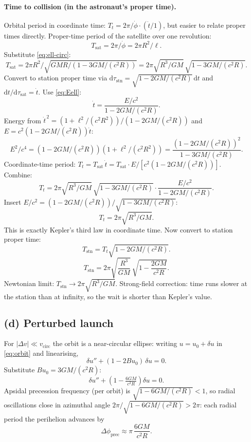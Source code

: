 \documentclass[11pt]{article}
\newcommand{\de}{\mathrm{d}}
\begin{document}
\paragraph{Time to collision (in the astronaut's proper time).}
Orbital period in coordinate time: $T_t = 2\pi/\dot\phi\cdot(\dot t/1)$, but easier to relate proper times directly. Proper-time period of the satellite over one revolution:
\[
T_\text{sat} = 2\pi/\dot\phi = 2\pi R^2/\ell.
\]
Substitute \eqref{eq:ell-circ}:
\[
T_\text{sat} = 2\pi R^2/\sqrt{GMR/(1-3GM/(c^2 R))} = 2\pi\sqrt{R^3/GM}\,\sqrt{1-3GM/(c^2 R)}.
\]
Convert to station proper time via $\de\tau_\text{stn} = \sqrt{1-2GM/(c^2 R)}\,\de t$ and $\de t/\de\tau_\text{sat} = \dot t$. Use \eqref{eq:Eell}:
\[
\dot t = \frac{E/c^2}{1-2GM/(c^2 R)}.
\]
Energy from $\dot t^{\,2} = (1+\ell^2/(c^2 R^2))/(1-2GM/(c^2 R))$ and $E = c^2(1-2GM/(c^2 R))\dot t$:
\[
E^2/c^4 = (1-2GM/(c^2 R))(1+\ell^2/(c^2 R^2)) = \frac{(1-2GM/(c^2 R))^2}{1-3GM/(c^2 R)}.
\]
Coordinate-time period: $T_t = T_\text{sat}\,\dot t = T_\text{sat}\cdot E/[c^2(1-2GM/(c^2 R))]$. Combine:
\[
T_t = 2\pi\sqrt{R^3/GM}\,\sqrt{1-3GM/(c^2 R)}\cdot\frac{E/c^2}{1-2GM/(c^2 R)}.
\]
Insert $E/c^2 = (1-2GM/(c^2 R))/\sqrt{1-3GM/(c^2 R)}$:
\[
T_t = 2\pi\sqrt{R^3/GM}.
\]
This is exactly Kepler's third law in coordinate time. Now convert to station proper time:
\[
T_\text{stn} = T_t\sqrt{1-2GM/(c^2 R)}.
\]
\begin{equation}
\boxed{\;T_\text{stn} = 2\pi\sqrt{\frac{R^3}{GM}}\,\sqrt{1-\frac{2GM}{c^2 R}}.\;}
\label{eq:Tstn}
\end{equation}
Newtonian limit: $T_\text{stn}\to 2\pi\sqrt{R^3/GM}$. Strong-field correction: time runs slower at the station than at infinity, so the wait is shorter than Kepler's value.

\subsection*{(d) Perturbed launch}

For $|\Delta v|\ll v_\text{circ}$ the orbit is a near-circular ellipse: writing $u = u_0 + \delta u$ in \eqref{eq:orbit} and linearising,
\[
\delta u'' + (1 - 2 B u_0)\,\delta u = 0.
\]
Substitute $B u_0 = 3GM/(c^2 R)$:
\[
\delta u'' + \!\left(1-\tfrac{6GM}{c^2 R}\right)\!\delta u = 0.
\]
Apsidal precession frequency (per orbit) is $\sqrt{1-6GM/(c^2 R)} < 1$, so radial oscillations close in azimuthal angle $2\pi/\sqrt{1-6GM/(c^2 R)} > 2\pi$: each radial period the perihelion advances by
\[
\Delta\phi_\text{prec} \approx \pi\,\frac{6GM}{c^2 R}.
\]
\end{document}
